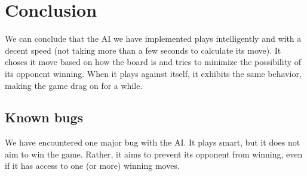 \section{Conclusion}
\label{Conclusion}

We can conclude that the AI we have implemented plays intelligently and with a decent speed (not taking more than a few seconds to calculate its move). It choses it move based on how the board is and tries to minimize the possibility of its opponent winning. When it plays against itself, it exhibits the same behavior, making the game drag on for a while.

\subsection{Known bugs}

We have encountered one major bug with the AI. It plays smart, but it does not aim to win the game. Rather, it aims to prevent its opponent from winning, even  if it has access to one (or more) winning moves. 